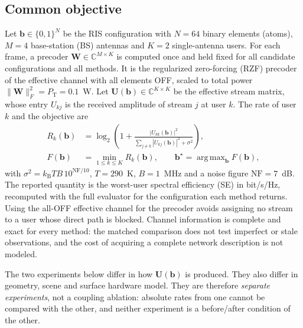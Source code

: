 \documentclass[conference]{IEEEtran}
\newcommand{\bvec}{\mathbf b}
\DeclareMathOperator*{\argmax}{arg\,max}
\begin{document}
\subsection{Common objective}
Let $\bvec\in\{0,1\}^N$ be the RIS configuration with $N=64$ binary elements (atoms), $M=4$ base-station (BS) antennas and $K=2$ single-antenna users. For each frame, a precoder $\mathbf W\in\mathbb C^{M\times K}$ is computed once and held fixed for all candidate configurations and all methods. It is the regularized zero-forcing (RZF) precoder of the effective channel with all elements OFF, scaled to total power $\|\mathbf W\|_F^2=P_{\mathrm T}=0.1$~W. Let $\mathbf U(\bvec)\in\mathbb C^{K\times K}$ be the effective stream matrix, whose entry $U_{kj}$ is the received amplitude of stream $j$ at user $k$. The rate of user $k$ and the objective are
\begin{align}
R_k(\bvec)&=\log_2\!\left(1+\frac{|U_{kk}(\bvec)|^2}{\sum_{j\neq k}|U_{kj}(\bvec)|^2+\sigma^2}\right),\label{eq:rate}\\
F(\bvec)&=\min_{1\le k\le K}R_k(\bvec),\qquad \bvec^\star=\argmax_{\bvec}F(\bvec),\label{eq:obj}
\end{align}
with $\sigma^2=k_{\mathrm B}T B\,10^{\mathrm{NF}/10}$, $T=290$~K, $B=1$~MHz and a noise figure $\mathrm{NF}=7$~dB. The reported quantity is the worst-user spectral efficiency (SE) in bit/s/Hz, recomputed with the full evaluator for the configuration each method returns. Using the all-OFF effective channel for the precoder avoids assigning no stream to a user whose direct path is blocked. Channel information is complete and exact for every method: the matched comparison does not test imperfect or stale observations, and the cost of acquiring a complete network description is not modeled.

The two experiments below differ in how $\mathbf U(\bvec)$ is produced. They also differ in geometry, scene and surface hardware model. They are therefore \emph{separate experiments}, not a coupling ablation: absolute rates from one cannot be compared with the other, and neither experiment is a before/after condition of the other.
\end{document}
